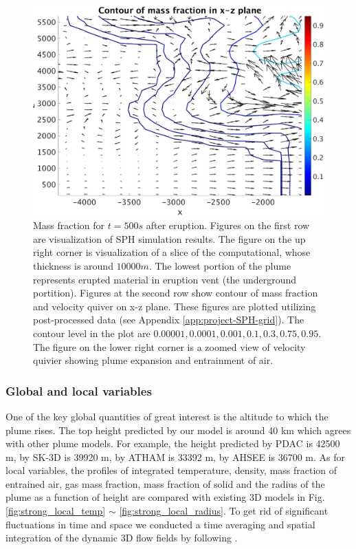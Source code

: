 \documentclass[gmd, manuscript]{copernicus}
\begin{document}
\begin{figure}[!htb]
\begin{minipage}{.45 \textwidth}
    \end{minipage}%
    \begin{minipage}{.45 \textwidth}
        \centering
        \includegraphics[width=0.99 \textwidth]{./gmd-mssfrc-xz-zoomed}
    \end{minipage}%
    \caption{Mass fraction for $t=500s$ after eruption. Figures on the first row are visualization of SPH simulation results. The figure on the up right corner is visualization of a slice of the computational, whose thickness is around $10000m$. The lowest portion of the plume represents erupted material in eruption vent (the underground portition). Figures at the second row show contour of mass fraction and velocity quiver on x-z plane. These figures are plotted utilizing post-processed data (see Appendix \ref{app:project-SPH-grid}). The contour level in the plot are $0.00001, 0.0001, 0.001, 0.1, 0.3, 0.75, 0.95$. The figure on the lower right corner is a zoomed view of velocity quivier showing plume expansion and entrainment of air.}
    \label{fig:pinatubo-simulation-results-vis}
\end{figure}

\subsubsection{Global and local variables}
One of the key global quantities of great interest is the altitude to which the plume rises. The top height predicted by our model is around 40 km which agrees with other plume models. For example, the height predicted by PDAC is 42500 m, by SK-3D is 39920 m, by ATHAM is 33392 m, by AHSEE is 36700 m. As for local variables, the profiles of integrated temperature, density, mass fraction of entrained air, gas mass fraction, mass fraction of solid and the radius of the plume as a function of height are compared with existing 3D models in Fig. \ref{fig:strong_local_temp} $\sim$ \ref{fig:strong_local_radius}. To get rid of significant fluctuations in time and space we conducted a time averaging and spatial integration of the dynamic 3D flow fields by following \citet {cerminara2016large}.
\end{document}
